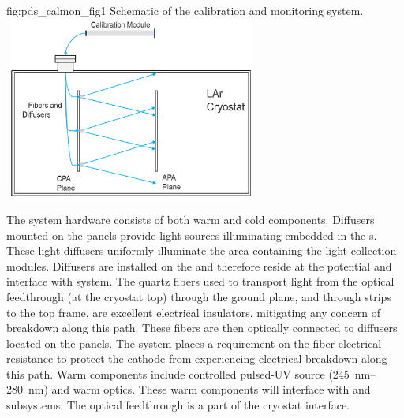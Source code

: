 
\begin{dunefigure}
 {fig:pds_calmon_fig1}
 {Schematic of the   calibration and monitoring system.}
\includegraphics[angle=0,width=8.4cm,height=6cm]{graphics/pds-calmon-fig1.png}
\end{dunefigure}

The system hardware consists of both warm and cold components. Diffusers mounted on the  panels provide light sources illuminating  embedded in the s. These light diffusers uniformly illuminate the  area containing the  light collection modules. %
 Diffusers are installed on the  and therefore reside at the %
  potential and interface with  system. 
The quartz fibers used to transport light from the optical feedthrough
(at the cryostat top) through the  ground plane, and through  strips to the  top frame, are excellent electrical insulators, mitigating any concern of breakdown along this path. These fibers are then optically connected to diffusers located on the  panels. 
The \hv system places a requirement on the fiber electrical resistance to 
protect the cathode from experiencing electrical breakdown along this path. 
Warm components include controlled pulsed-UV source (\SIrange{245}{280}{nm}) and warm optics. These warm components will interface with
 and  subsystems. The optical feedthrough is a part of the cryostat interface.

